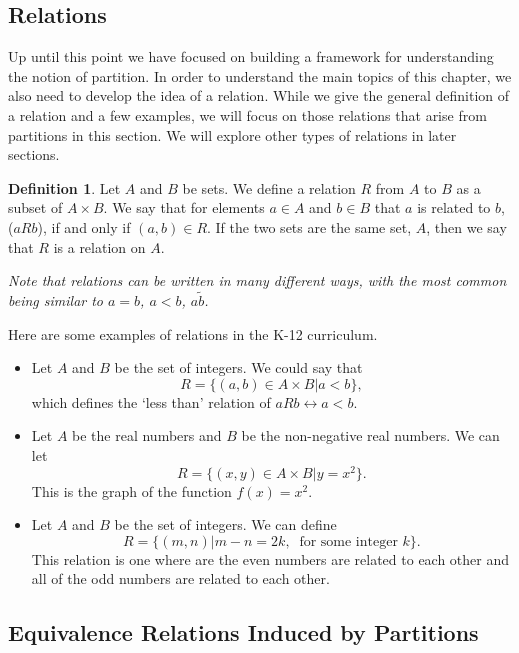 \documentclass[
]{book}
\theoremstyle{definition}
\newtheorem{definition}{Definition}[chapter]
\theoremstyle{definition}
\theoremstyle{definition}
\theoremstyle{definition}
\theoremstyle{remark}
\begin{document}
\hypertarget{relations}{%
\subsection{Relations}\label{relations}}

Up until this point we have focused on building a framework for understanding the notion of partition. In order to understand the main topics of this chapter, we also need to develop the idea of a relation. While we give the general definition of a relation and a few examples, we will focus on those relations that arise from partitions in this section. We will explore other types of relations in later sections.

\begin{definition}
\protect\hypertarget{def:relation}{}\label{def:relation}Let \(A\) and \(B\) be sets. We define a relation \(R\) from \(A\) to \(B\) as a subset of \(A\times B\). We say that for elements \(a\in A\) and \(b\in B\) that \(a\) is related to \(b\), (\(aRb\)), if and only if \((a,b)\in R\). If the two sets are the same set, \(A\), then we say that \(R\) is a relation on \(A\).
\end{definition}

\emph{Note that relations can be written in many different ways, with the most common being similar to \(a=b\), \(a<b\), \(a\tilde b\).}

Here are some examples of relations in the K-12 curriculum.

\begin{itemize}
\item
  Let \(A\) and \(B\) be the set of integers. We could say that \[R=\{(a,b)\in A\times B \vert a<b\},\] which defines the `less than' relation of \(aRb \leftrightarrow a<b\).
\item
  Let \(A\) be the real numbers and \(B\) be the non-negative real numbers. We can let \[R=\{(x,y)\in A\times B \vert y=x^2\}.\] This is the graph of the function \(f(x)=x^2\).
\item
  Let \(A\) and \(B\) be the set of integers. We can define \[R= \{(m,n) \vert m-n=2k, \: \mbox{ for some integer } k\}.\] This relation is one where are the even numbers are related to each other and all of the odd numbers are related to each other.
\end{itemize}

\hypertarget{equivalence-relations-induced-by-partitions}{%
\subsection{Equivalence Relations Induced by Partitions}\label{equivalence-relations-induced-by-partitions}}
\end{document}
